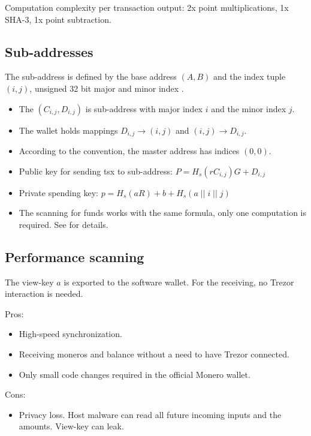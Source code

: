 \documentclass[]{article}
\begin{document}
Computation complexity per transaction output: 2x point multiplications, 1x SHA-3, 1x point subtraction.

\subsection{Sub-addresses}
The sub-address is defined by the base address $(A,B)$ and the index tuple $(i,j)$, unsigned 32 bit major and minor index \cite{mrl_006_subaddr}.

\begin{itemize}
	\item The $(C_{i,j}, D_{i,j})$ is sub-address with major index $i$ and the minor index $j$.
	
	\item  The wallet holds mappings $D_{i,j} \rightarrow (i, j)$ and $(i, j) \rightarrow D_{i,j}$. 
	
	\item According to the convention, the master address has indices $(0, 0)$.
	
	\item Public key for sending tsx to sub-address: $P = H_s(rC_{i,j})G + D_{i,j}$
	
	\item Private spending key: $p = H_s(aR) + b + H_s(a \; || \; i \; || \; j)$
	
	\item The scanning for funds works with the same formula, only one computation is required. See \cite{mrl_006_subaddr} for details.
\end{itemize}

\subsection{Performance scanning} 
The view-key $a$ is exported to the software wallet. For the receiving, no Trezor interaction is needed. 

\noindent Pros:
\begin{itemize}
	\item High-speed synchronization.
	\item Receiving moneros and balance without a need to have Trezor connected.
	\item Only small code changes required in the official Monero wallet.
\end{itemize}

\noindent Cons:
\begin{itemize}
	\item Privacy loss. Host malware can read all future incoming inputs and the amounts. View-key can leak.
\end{itemize}
\end{document}

